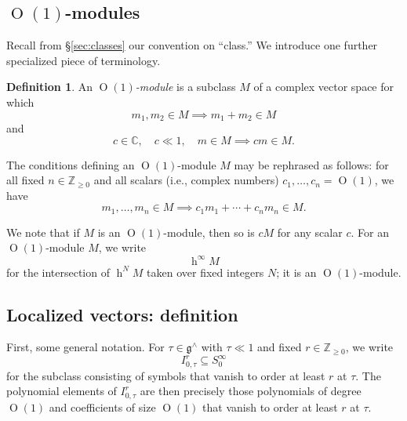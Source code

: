 \documentclass[reqno]{amsart}
\DeclareMathOperator{\h}{h}
\DeclareMathOperator{\End}{End}
\def\O{\operatorname{O}}
\DeclareMathOperator{\Opp}{Op}
\theoremstyle{plain} \newtheorem{theorem} {Theorem}
\theoremstyle{definition} \newtheorem{definition} [theorem] {Definition}
\theoremstyle{itplain} %
\numberwithin{equation}{section}
\numberwithin{theorem}{section}
\renewcommand{\geq}{\geqslant}
\begin{document}


\subsection{$\O(1)$-modules}
Recall from \S\ref{sec:classes}  our convention on ``class.''  We introduce one further specialized piece of terminology.
\begin{definition}
  An \emph{$\O(1)$-module} is a subclass $M$ of a complex vector space for which
  \[
    m_1, m_2 \in M \implies m_1 + m_2 \in M
  \]
  and
  \[
    c \in \mathbb{C}, \quad c \ll 1, \quad m \in M \implies c m \in M.
  \]
\end{definition}
The conditions defining an $\O(1)$-module $M$ may be rephrased as follows: for all fixed $n \in \mathbb{Z}_{\geq 0}$ and all scalars (i.e., complex numbers) $c_1, \dotsc,c_n = \O(1)$, we have
\begin{equation*}
  m_1,\dotsc,m_n \in M \implies c_1 m_1 + \dotsb + c_n m_n \in M.
\end{equation*}

We note that if $M$ is an $\O(1)$-module, then so is $c M$ for any scalar $c$.  For an $\O(1)$-module $M$, we write
\begin{equation*}
\h^\infty M
\end{equation*}
for the intersection of $\h^N M$ taken over fixed integers $N$; it is an $\O(1)$-module.

\subsection{Localized vectors: definition}\label{sec:local-vect-defin}
First, some general notation.  For $\tau \in \mathfrak{g}^\wedge$ with $\tau \ll 1$ and fixed $r \in \mathbb{Z}_{\geq 0}$, we write
\[I_{0,\tau}^r \subseteq S_0^\infty\] for the subclass consisting of symbols that vanish to order at least $r$ at $\tau$.  The polynomial elements of $I_{0,\tau}^r$ are then precisely those polynomials of degree $\O(1)$ and coefficients of size $\O(1)$ that vanish to order at least $r$ at $\tau$.
\end{document}
